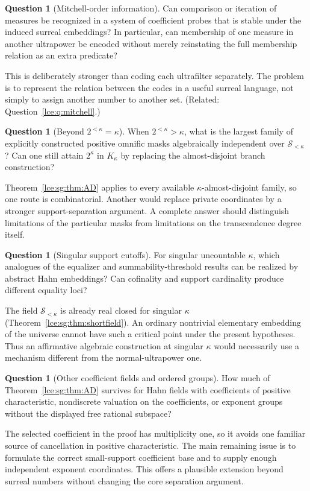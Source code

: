 \documentclass[11pt,letterpaper]{article}
\numberwithin{equation}{section}
\theoremstyle{definition}
\newtheorem{question}[theorem]{Question}
\theoremstyle{remark}
\newcommand{\Sk}{\mathscr S_{<\kappa}}
\newcommand{\thref}[1]{Theorem~\ref{#1}}
\begin{document}
\begin{question}[Mitchell-order information]\label{lce:sg:q:mitchell}
Can comparison or iteration of measures be recognized in a system of
coefficient probes that is stable under the induced surreal embeddings? In
particular, can membership of one measure in another ultrapower be encoded
without merely reinstating the full membership relation as an extra
predicate?
\end{question}
This is deliberately stronger than coding each ultrafilter separately. The
problem is to represent the relation between the codes in a useful surreal
language, not simply to assign another number to another set. (Related:
Question~\ref{lce:q:mitchell}.)

\begin{question}[Beyond $2^{<\kappa}=\kappa$]\label{lce:sg:q:AD}
When $2^{<\kappa}>\kappa$, what is the largest family of explicitly
constructed positive omnific masks algebraically independent over $\Sk$? Can
one still attain $2^\kappa$ in $K_\kappa$ by replacing the almost-disjoint
branch construction?
\end{question}
\thref{lce:sg:thm:AD} applies to every available $\kappa$-almost-disjoint
family, so one route is combinatorial. Another would replace private
coordinates by a stronger support-separation argument. A complete answer
should distinguish limitations of the particular masks from limitations on
the transcendence degree itself.

\begin{question}[Singular support cutoffs]\label{lce:sg:q:singular}
For singular uncountable $\kappa$, which analogues of the equalizer and
summability-threshold results can be realized by abstract Hahn embeddings?
Can cofinality and support cardinality produce different equality loci?
\end{question}
The field $\Sk$ is already real closed for singular $\kappa$
(\thref{lce:sg:thm:shortfield}). An ordinary nontrivial elementary embedding
of the universe cannot have such a critical point under the present
hypotheses. Thus an affirmative algebraic construction at singular $\kappa$
would necessarily use a mechanism different from the normal-ultrapower one.

\begin{question}[Other coefficient fields and ordered groups]\label{lce:sg:q:fields}
How much of \thref{lce:sg:thm:AD} survives for Hahn fields with coefficients
of positive characteristic, nondiscrete valuation on the coefficients, or
exponent groups without the displayed free rational subspace?
\end{question}
The selected coefficient in the proof has multiplicity one, so it avoids one
familiar source of cancellation in positive characteristic. The main
remaining issue is to formulate the correct small-support coefficient base
and to supply enough independent exponent coordinates. This offers a
plausible extension beyond surreal numbers without changing the core
separation argument.
\end{document}
